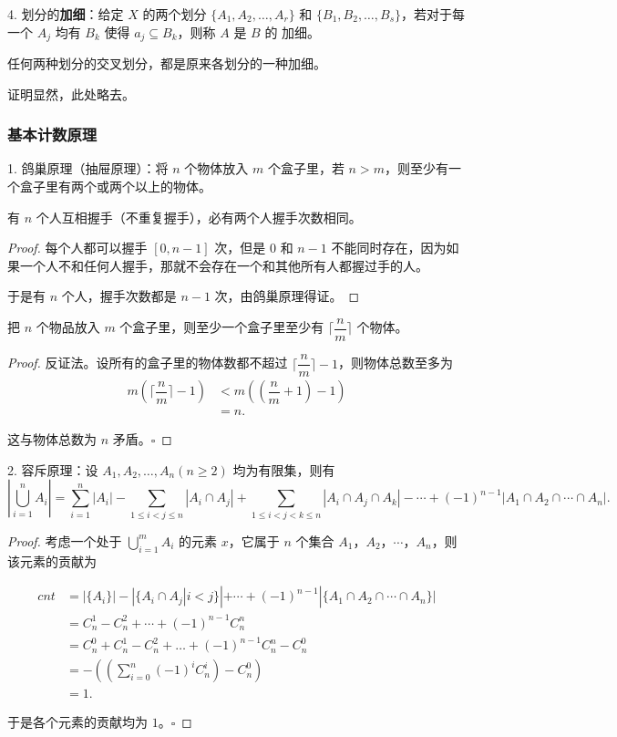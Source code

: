 \documentclass[normal,cyan]{elegantnote}
\newcommand{\Sum}[3]{\sum\limits_{#1 = #2}^{#3}}
\newcommand{\QED}{\square}
\begin{document}
4. 划分的\textbf{加细}：给定 $X$ 的两个划分 $\{A_1, A_2, \dots, A_r\}$ 和 $\{B_1, B_2, \dots, B_s\}$，若对于每一个 $A_j$ 均有 $B_k$ 使得 $a_j \subseteq B_k$，则称 $A$ 是 $B$ 的{\color{red} 加细}。
\begin{theorem}
    任何两种划分的交叉划分，都是原来各划分的一种加细。
\end{theorem}
证明显然，此处略去。

\subsubsection{基本计数原理}
1. 鸽巢原理（抽屉原理）：将 $n$ 个物体放入 $m$ 个盒子里，若 $n > m$，则至少有一个盒子里有两个或两个以上的物体。
\begin{example}
    有 $n$ 个人互相握手（不重复握手），必有两个人握手次数相同。
\end{example}
\begin{proof}
    每个人都可以握手 $[0, n - 1]$ 次，但是 $0$ 和 $n - 1$ 不能同时存在，因为如果一个人不和任何人握手，那就不会存在一个和其他所有人都握过手的人。

    于是有 $n$ 个人，握手次数都是 $n - 1$ 次，由鸽巢原理得证。
\end{proof}
\begin{theorem}
    把 $n$ 个物品放入 $m$ 个盒子里，则至少一个盒子里至少有 $\lceil\dfrac nm \rceil$ 个物体。
\end{theorem}
\begin{proof}
    反证法。设所有的盒子里的物体数都不超过 $\lceil \dfrac nm \rceil -1$，则物体总数至多为 $$\begin{aligned}m \left(\lceil \dfrac nm \rceil - 1\right) &< m\left(\left(\dfrac nm + 1\right) - 1\right) \\ &= n.\end{aligned}$$
    
    这与物体总数为 $n$ 矛盾。$\QED$
\end{proof}
2. 容斥原理：设 $A_1, A_2, \dots, A_n(n \geq 2)$ 均为有限集，则有 $$\left|\bigcup\limits_{i = 1}^n A_i\right| = \Sum{i}{1}{n}|A_i| - \sum\limits_{1 \leq i < j \leq n}|A_i \cap A_j| + \sum\limits_{1 \leq i < j < k \leq n}|A_i \cap A_j \cap A_k| - \cdots + (-1)^{n - 1}|A_1 \cap A_2 \cap \cdots \cap A_n|.$$
\begin{proof}
    考虑一个处于 $\bigcup\limits_{i = 1}^m A_i$ 的元素 $x$，它属于 $n$ 个集合 $A_1$，$A_2$，$\cdots$，$A_n$，则该元素的贡献为

$$\begin{aligned}cnt &= |\{A_i\}| - |\{A_i \cap A_j|i < j\} | + \cdots + (-1)^{n - 1} |\{A_1\cap A_2\cap\cdots\cap A_n\} | \\ &= C_n^1-C_n^2+\cdots+(-1)^{n-1}C_n^n \\&= C_n^0+C_n^1-C_n^2+\dots+(-1)^{n-1}C_n^n - C_n^0 \\ &=-\left(\left(\sum\limits_{i = 0}^n(-1)^iC_n^i\right)-C_n^0\right) \\ &= 1.\end{aligned}$$

于是各个元素的贡献均为 $1$。$\QED$
\end{proof}
\end{document}
